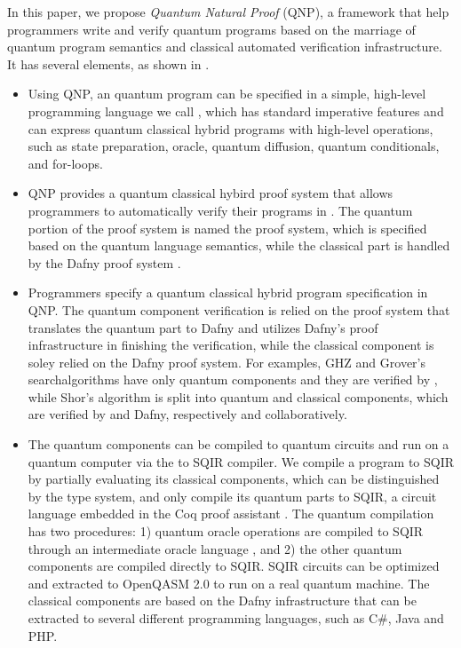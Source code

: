 In this paper, we propose \emph{Quantum Natural Proof} (QNP), a framework that help programmers write and verify quantum programs based on the marriage of quantum program semantics and classical automated verification infrastructure. It has several elements, as shown in .

\begin{itemize}
\item Using QNP, an quantum program can be specified in a simple, high-level programming
language we call \qafny, which has standard imperative features and
can express quantum classical hybrid programs with high-level operations,
such as state preparation, oracle, quantum diffusion, quantum conditionals, and for-loops.

\item QNP provides a quantum classical hybird proof system that allows programmers to automatically verify their programs in \qafny.
The quantum portion of the proof system is named the \qafny proof system,
which is specified based on the \qafny quantum language semantics, while the classical part is handled by the Dafny proof system \cite{dafnyref}. 

\item Programmers specify a quantum classical hybrid program specification in QNP. The quantum component verification is relied on the \qafny proof system that translates the quantum part to Dafny and utilizes Dafny's proof infrastructure in finishing the verification,
while the classical component is soley relied on the Dafny proof system.
For examples, GHZ and Grover's searchalgorithms have only quantum components and they are verified by \qafny, while Shor's algorithm is split into quantum and classical components, which are verified by \qafny and Dafny, respectively and collaboratively.

\item The \qafny quantum components can be compiled to quantum circuits and run on a quantum computer via the \qafny to SQIR compiler. 
We compile a \qafny program to SQIR by partially evaluating its classical components, which can be distinguished by the \qafny type system, and only compile its quantum parts to SQIR,  a circuit language embedded in the Coq proof assistant \cite{PQPC,VOQC}.
The quantum compilation has two procedures: 1) quantum oracle operations are compiled to SQIR through an intermediate oracle language \oqasm \cite{oracleoopsla}, and 2) the other quantum components are compiled directly to SQIR. SQIR circuits can be optimized and extracted to OpenQASM 2.0 \cite{Cross2017} to run on a real quantum machine. The \qafny classical components are based on the Dafny infrastructure that can be extracted to several different programming languages, such as C\#, Java and PHP.

\end{itemize}

